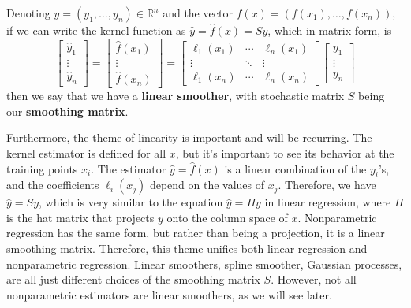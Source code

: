   Denoting $y = (y_1, \ldots, y_n) \in \mathbb{R}^n$ and the vector $f(x) = (f(x_1), \ldots, f(x_n))$, if we can write the kernel function as $\hat{y} = \hat{f}(x) = S y$, which in matrix form, is 
  \begin{equation}
    \begin{bmatrix} \hat{y}_1 \\ \vdots \\ \hat{y}_n \end{bmatrix} = \begin{bmatrix} \hat{f}(x_1) \\ \vdots \\ \hat{f} (x_n) \end{bmatrix} = \begin{bmatrix} \ell_1 (x_1) & \cdots & \ell_n (x_1) \\ \vdots & \ddots & \vdots \\ \ell_1 (x_n) & \cdots & \ell_n (x_n) \end{bmatrix} \begin{bmatrix} y_1 \\ \vdots \\ y_n \end{bmatrix} 
  \end{equation}
  then we say that we have a \textbf{linear smoother}, with stochastic matrix $S$ being our \textbf{smoothing matrix}. 

  Furthermore, the theme of linearity is important and will be recurring. The kernel estimator is defined for all $x$, but it's important to see its behavior at the training points $x_i$. The estimator $\hat{y} = \hat{f}(x)$ is a linear combination of the $y_i$'s, and the coefficients $\ell_i (x_j)$ depend on the values of $x_j$. Therefore, we have $\hat{y} = S y$, which is very similar to the equation $\hat{y} = H y$ in linear regression, where $H$ is the hat matrix that projects $y$ onto the column space of $x$. Nonparametric regression has the same form, but rather than being a projection, it is a linear smoothing matrix. Therefore, this theme unifies both linear regression and nonparametric regression. Linear smoothers, spline smoother, Gaussian processes, are all just different choices of the smoothing matrix $S$. However, not all nonparametric estimators are linear smoothers, as we will see later. 

